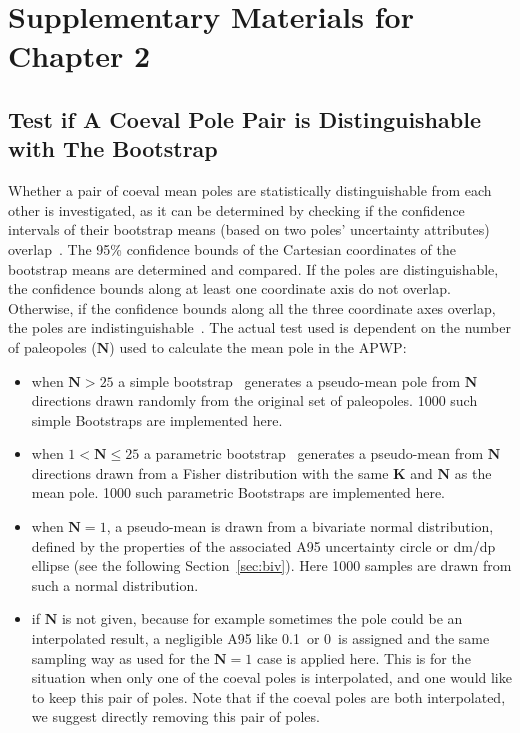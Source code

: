 \section*{Supplementary Materials for Chapter 2}

\subsection{Test if A Coeval Pole Pair is Distinguishable with The Bootstrap}
Whether a pair of coeval mean poles are statistically distinguishable from each
other is investigated, as it can be determined by checking if the confidence
intervals of their bootstrap means (based on two poles' uncertainty attributes)
overlap~\citep{T91}. The 95\% confidence bounds of the Cartesian coordinates of
the bootstrap means are determined and compared. If the poles are
distinguishable, the confidence bounds along at least one coordinate axis do not
overlap. Otherwise, if the confidence bounds along all the three coordinate axes
overlap, the poles are indistinguishable~\citep{T91}. The actual test used is
dependent on the number of paleopoles ($\mathbf{N}$) used to calculate the mean
pole in the APWP$\colon$

\begin{itemize}
\item when $\mathbf{N}>25$ a simple bootstrap~\citep{T91} generates a
pseudo-mean pole from $\mathbf{N}$ directions drawn randomly from the original
set of paleopoles. 1000 such simple Bootstraps are implemented here.
\item when $1<\mathbf{N}\leq25$ a parametric bootstrap~\citep{T91} generates a
pseudo-mean from $\mathbf{N}$ directions drawn from a Fisher distribution with
the same $\mathbf{K}$ and $\mathbf{N}$ as the mean pole. 1000 such parametric
Bootstraps are implemented here.
\item when $\mathbf{N}=1$, a pseudo-mean is drawn from a bivariate normal
distribution, defined by the properties of the associated A95 uncertainty
circle or dm/dp ellipse (see the following Section~\ref{sec:biv}). Here 1000
samples are drawn from such a normal distribution.
\item if $\mathbf{N}$ is not given, because for example sometimes the pole could
be an interpolated result, a negligible A95 like 0.1\degree\ or 0\degree\ is
assigned and the same sampling way as used for the $\mathbf{N}=1$ case is
applied here. This is for the situation when only one of the coeval poles is
interpolated, and one would like to keep this pair of poles. Note that if the
coeval poles are both interpolated, we suggest directly removing this pair of
poles.
\end{itemize}

